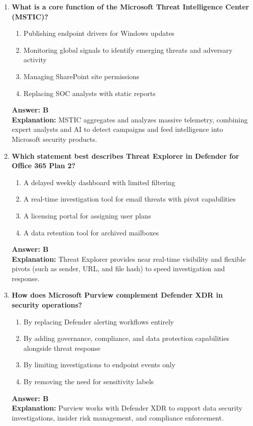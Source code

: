 \documentclass[10pt]{article}
\begin{document}
\begin{enumerate}[leftmargin=*]
\item \textbf{What is a core function of the Microsoft Threat Intelligence Center (MSTIC)?}
\begin{enumerate}[label=\Alph*.]
  \item Publishing endpoint drivers for Windows updates
  \item Monitoring global signals to identify emerging threats and adversary activity
  \item Managing SharePoint site permissions
  \item Replacing SOC analysts with static reports
\end{enumerate}
\textbf{Answer: B}\\
\textbf{Explanation:} MSTIC aggregates and analyzes massive telemetry, combining expert analysts and AI to detect campaigns and feed intelligence into Microsoft security products.

\item \textbf{Which statement best describes Threat Explorer in Defender for Office 365 Plan 2?}
\begin{enumerate}[label=\Alph*.]
  \item A delayed weekly dashboard with limited filtering
  \item A real-time investigation tool for email threats with pivot capabilities
  \item A licensing portal for assigning user plans
  \item A data retention tool for archived mailboxes
\end{enumerate}
\textbf{Answer: B}\\
\textbf{Explanation:} Threat Explorer provides near real-time visibility and flexible pivots (such as sender, URL, and file hash) to speed investigation and response.

\item \textbf{How does Microsoft Purview complement Defender XDR in security operations?}
\begin{enumerate}[label=\Alph*.]
  \item By replacing Defender alerting workflows entirely
  \item By adding governance, compliance, and data protection capabilities alongside threat response
  \item By limiting investigations to endpoint events only
  \item By removing the need for sensitivity labels
\end{enumerate}
\textbf{Answer: B}\\
\textbf{Explanation:} Purview works with Defender XDR to support data security investigations, insider risk management, and compliance enforcement.

\end{enumerate}
\clearpage
\end{document}
